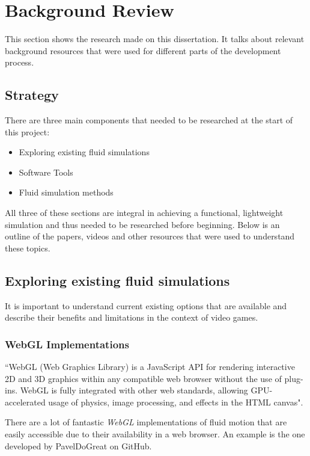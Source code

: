 \documentclass[12pt]{article}
\begin{document}
    \section{Background Review}
    This section shows the research made on this dissertation. It talks about relevant background resources that were used for different parts of the development process.
    
    \subsection{Strategy}
    There are three main components that needed to be researched at the start of this project:
    \begin{itemize}
        \item Exploring existing fluid simulations
        \item Software Tools
        \item Fluid simulation methods
    \end{itemize}
    \sloppy
    All three of these sections are integral in achieving a functional, lightweight simulation and thus needed to be researched before beginning. Below is an outline of the papers, videos and other resources that were used to understand these topics.

    \subsection{Exploring existing fluid simulations}
    It is important to understand current existing options that are available and describe their benefits and limitations in the context of video games.

    \subsubsection{WebGL Implementations}

    ``WebGL (Web Graphics Library) is a JavaScript API for rendering interactive 2D and 3D graphics within any compatible web browser without the use of plug-ins. WebGL is fully integrated with other web standards, allowing GPU-accelerated usage of physics, image processing, and effects in the HTML canvas".\cite{webglwikipedia}

    There are a lot of fantastic \textit{WebGL} implementations of fluid motion that are easily accessible due to their availability in a web browser. An example is the one developed by PavelDoGreat on GitHub.
\end{document}
